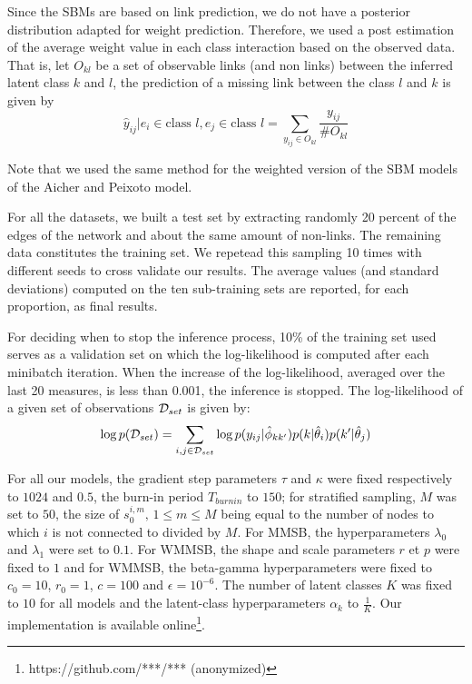 Since the SBMs are based on link prediction, we do not have a posterior distribution adapted for weight prediction. Therefore, we used a post estimation of the average weight value in each class interaction based on the observed data. That is, let $O_{kl}$ be a set of observable links (and non links) between the inferred latent class $k$ and $l$, the prediction of a missing link between the class $l$ and $k$ is given by
\[
\hat y_{ij} | e_i \in \text{class } l, e_j \in \text{class }l  = \sum_{y_{ij} \in O_{kl}} \frac{y_{ij}}{\# O_{kl}}
\]

Note that we used the same method for the weighted version of the SBM models of the Aicher and Peixoto model. 

For all the datasets, we built a test set by extracting randomly 20 percent of the edges of the network and about the same amount of non-links. The remaining data constitutes the training set. We repetead this sampling 10  times with different seeds to cross validate our results. The average values (and standard deviations) computed on the ten sub-training sets are reported, for each proportion, as final results.

For deciding when to stop the inference process, 10\% of the training set used serves as a validation set on which the log-likelihood is computed after each minibatch iteration. When the increase of the log-likelihood, averaged over the last 20 measures, is less than 0.001, the inference is stopped. The log-likelihood of a given set of observations $\mathcal{D}_{set}$  is given by:
\begin{equation*}
\log p(\mathcal{D}_{set}) = \sum_{i,j \in \mathcal{D}_{set}} \log p(y_{ij} | \hat\phi_{kk'}) p(k|\hat\theta_i) p(k'|\hat\theta_j)
\end{equation*}

For all our models, the gradient step parameters  $\tau$ and $\kappa$ were fixed respectively to  $1024$ and $0.5$, the burn-in period $T_{burnin}$ to $150$; for stratified sampling, $M$ was set to $50$, the size of $s_0^{i,m}, \, 1 \le m \le M$ being equal to the number of nodes to which $i$ is not connected to divided by $M$. For MMSB, the hyperparameters $\lambda_0$ and $\lambda_1$ were set to $0.1$. For WMMSB, the shape and scale parameters $r$ et $p$ were fixed to $1$ and for WMMSB, the beta-gamma hyperparameters were fixed to  $c_0=10$, $r_0=1$, $c=100$ and $\epsilon=10^{-6}$. The number of latent classes $K$ was fixed to $10$ for all models and the latent-class hyperparameters $\alpha_k$ to $\frac{1}{K}$. Our implementation is available online\footnote{https://github.com/***/*** (anonymized)}. 


